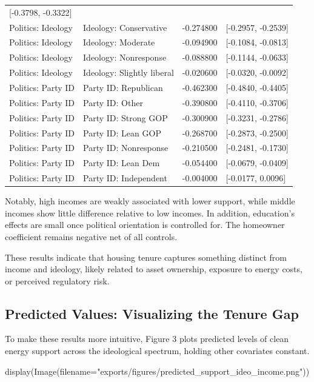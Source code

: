 \documentclass[
  letterpaper,
  DIV=11,
  numbers=noendperiod]{scrartcl}
\newenvironment{Shaded}{\begin{snugshade}}{\end{snugshade}}
\newcommand{\NormalTok}[1]{\textcolor[rgb]{0.00,0.23,0.31}{#1}}
\newcommand{\OperatorTok}[1]{\textcolor[rgb]{0.37,0.37,0.37}{#1}}
\newcommand{\StringTok}[1]{\textcolor[rgb]{0.13,0.47,0.30}{#1}}
\begin{document}
\begin{longtable}[]{@{}llll@{}}
{[}-0.3798, -0.3322{]} \\
Politics: Ideology & Ideology: Conservative & -0.274800 & {[}-0.2957,
-0.2539{]} \\
Politics: Ideology & Ideology: Moderate & -0.094900 & {[}-0.1084,
-0.0813{]} \\
Politics: Ideology & Ideology: Nonresponse & -0.088800 & {[}-0.1144,
-0.0633{]} \\
Politics: Ideology & Ideology: Slightly liberal & -0.020600 &
{[}-0.0320, -0.0092{]} \\
Politics: Party ID & Party ID: Republican & -0.462300 & {[}-0.4840,
-0.4405{]} \\
Politics: Party ID & Party ID: Other & -0.390800 & {[}-0.4110,
-0.3706{]} \\
Politics: Party ID & Party ID: Strong GOP & -0.300900 & {[}-0.3231,
-0.2786{]} \\
Politics: Party ID & Party ID: Lean GOP & -0.268700 & {[}-0.2873,
-0.2500{]} \\
Politics: Party ID & Party ID: Nonresponse & -0.210500 & {[}-0.2481,
-0.1730{]} \\
Politics: Party ID & Party ID: Lean Dem & -0.054400 & {[}-0.0679,
-0.0409{]} \\
Politics: Party ID & Party ID: Independent & -0.004000 & {[}-0.0177,
0.0096{]} \\
\end{longtable}

Notably, high incomes are weakly associated with lower support, while
middle incomes show little difference relative to low incomes. In
addition, education's effects are small once political orientation is
controlled for. The homeowner coefficient remains negative net of all
controls.

These results indicate that housing tenure captures something distinct
from income and ideology, likely related to asset ownership, exposure to
energy costs, or perceived regulatory risk.

\subsection{Predicted Values: Visualizing the Tenure
Gap}\label{predicted-values-visualizing-the-tenure-gap}

To make these results more intuitive, Figure 3 plots predicted levels of
clean energy support across the ideological spectrum, holding other
covariates constant.

\begin{Shaded}
\begin{Highlighting}[]
\NormalTok{display(Image(filename}\OperatorTok{=}\StringTok{"exports/figures/predicted\_support\_ideo\_income.png"}\NormalTok{))}
\end{Highlighting}
\end{Shaded}
\end{document}
